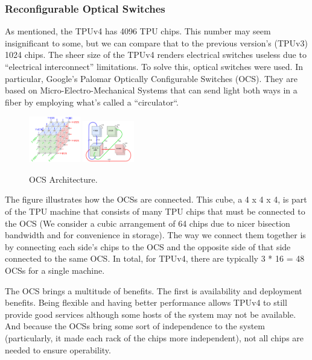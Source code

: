 \documentclass[conference]{IEEEtran}
\begin{document}
    \subsubsection{Reconfigurable Optical Switches}
    As mentioned, the TPUv4 has 4096 TPU chips.
    This number may seem insignificant to some, but we can compare that to the previous version’s (TPUv3) 1024 chips.
    The sheer size of the TPUv4 renders electrical switches useless due to “electrical interconnect” limitations.
    To solve this, optical switches were used.
    In particular, Google's Palomar Optically Configurable Switches (OCS).
    They are based on Micro-Electro-Mechanical Systems that can send light both ways in a fiber by employing what's called a ``circulator``.

    \begin{figure}[htbp!]
        \centerline{\includegraphics[width=0.2\textwidth]{images/tpu_cube}
        \includegraphics[width=0.2\textwidth]{images/tpu_connectivity}}
        \caption{OCS Architecture.}
        \label{fig}
    \end{figure}

    The figure illustrates how the OCSs are connected.
    This cube, a 4 x 4 x 4, is part of the TPU machine that consists of many TPU chips that must be connected to the OCS (We consider a cubic arrangement of 64 chips due to nicer bisection bandwidth and for convenience in storage).
    The way we connect them together is by connecting each side’s chips to the OCS and the opposite side of that side connected to the same OCS\@.
    In total, for TPUv4, there are typically 3 * 16 = 48 OCSs for a single machine.

    The OCS brings a multitude of benefits.
    The first is availability and deployment benefits.
    Being flexible and having better performance allows TPUv4 to still provide good services although some hosts of the system may not be available.
    And because the OCSs bring some sort of independence to the system (particularly, it made each rack of the chips more independent), not all chips are needed to ensure operability.
\end{document}
